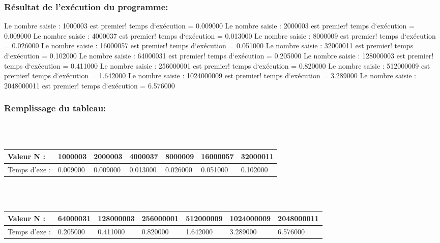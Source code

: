 \documentclass[12pt]{article}
\begin{document}
\subsubsection{Résultat de l'exécution du programme:}
\begin{sql}
Le nombre saisie : 1000003 est premier!
temps d`exécution = 0.009000
Le nombre saisie : 2000003 est premier!
temps d`exécution = 0.009000
Le nombre saisie : 4000037 est premier!
temps d`exécution = 0.013000
Le nombre saisie : 8000009 est premier!
temps d`exécution = 0.026000
Le nombre saisie : 16000057 est premier!
temps d`exécution = 0.051000
Le nombre saisie : 32000011 est premier!
temps d`exécution = 0.102000
Le nombre saisie : 64000031 est premier!
temps d`exécution = 0.205000
Le nombre saisie : 128000003 est premier!
temps d`exécution = 0.411000
Le nombre saisie : 256000001 est premier!
temps d`exécution = 0.820000
Le nombre saisie : 512000009 est premier!
temps d`exécution = 1.642000
Le nombre saisie : 1024000009 est premier!
temps d`exécution = 3.289000
Le nombre saisie : 2048000011 est premier!
temps d`exécution = 6.576000
\end{sql}


\subsubsection{Remplissage du tableau:}
\color{blue}
\textrm{  }
\\
\\
\begin{tabular}{|p{3cm}||p{1.8cm}|p{1.8cm}|p{1.8cm}|p{1.8cm}|p{1.8cm}|p{1.8cm}|}
\hline
Valeur N : & 1000003 & 2000003 & 4000037 & 8000009 & 16000057  & 32000011\\
\hline
Temps d'exe : & 0.009000 & 0.009000 & 0.013000 & 0.026000 & 0.051000 & 0.102000 \\
\hline
\end{tabular}
\\
\\
\begin{tabular}{|p{3cm}||p{1.8cm}|p{1.8cm}|p{1.8cm}|p{1.8cm}|p{1.8cm}|p{1.8cm}|}
\hline
Valeur N : & 64000031 & 128000003 & 256000001 & 512000009 &  1024000009 & 2048000011\\
\hline
Temps d'exe : &  0.205000 & 0.411000 & 0.820000 & 1.642000 & 3.289000 & 6.576000 \\
\hline
\end{tabular}


\textrm{  }
\\
\color{black}
\end{document}

